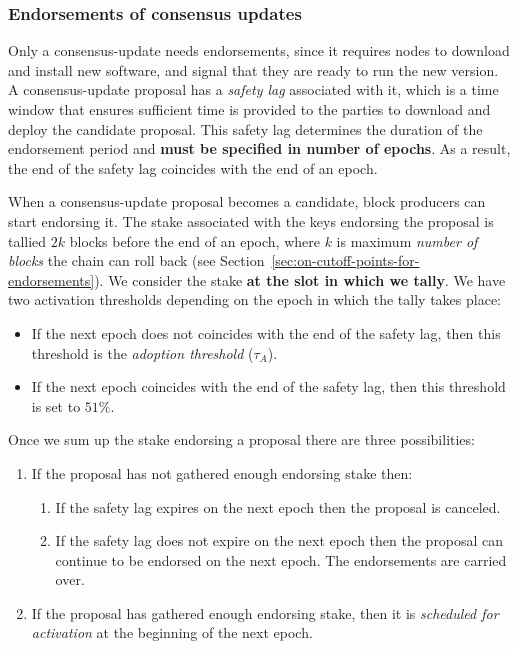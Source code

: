 \subsubsection{Endorsements of consensus updates}
\label{sec:endorsemnts}

Only a consensus-update needs endorsements, since it requires nodes to download
and install new software, and signal that they are ready to run the new version.
A consensus-update proposal has a \emph{safety lag} associated with it, which is
a time window that ensures sufficient time is provided to the parties to
download and deploy the candidate proposal. This safety lag determines the
duration of the endorsement period and \textbf{must be specified in number of
  epochs}. As a result, the end of the safety lag coincides with the end of an
epoch.

When a consensus-update proposal becomes a candidate, block producers can start
endorsing it. The stake associated with the keys endorsing the proposal is
tallied $2k$ blocks before the end of an epoch, where $k$ is maximum
\emph{number of blocks} the chain can roll back (see
Section~\ref{sec:on-cutoff-points-for-endorsements}). We consider the stake
\textbf{at the slot in which we tally}. We have two activation thresholds
depending on the epoch in which the tally takes place:
\begin{itemize}
\item If the next epoch does not coincides with the end of the safety lag, then
  this threshold is the \emph{adoption threshold} ($\tau_A$).
\item If the next epoch coincides with the end of the safety lag, then this
  threshold is set to $51\%$.
\end{itemize}

Once we sum up the stake endorsing a proposal there are three possibilities:
\begin{enumerate}
\item If the proposal has not gathered enough endorsing stake then:
  \begin{enumerate}
  \item If the safety lag expires on the next epoch then the proposal is
    canceled.
  \item If the safety lag does not expire on the next epoch then the proposal
    can continue to be endorsed on the next epoch. The endorsements are carried
    over.
  \end{enumerate}
\item If the proposal has gathered enough endorsing stake, then it is
  \emph{scheduled for activation} at the beginning of the next epoch.
\end{enumerate}

